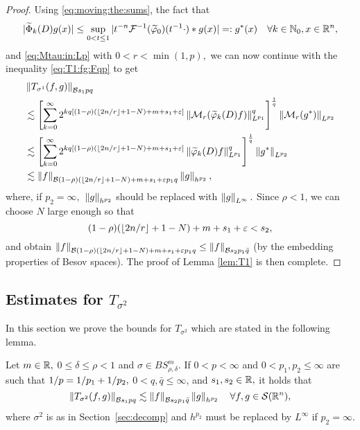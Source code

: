 \begin{proof}
Using  \eqref{eq:moving:the:sums},  the fact that  
\begin{equation}\label{def:g*}
|\widetilde{\Phi}_k(D)g(x)| \leq \sup\limits_{0 < t \le 1} |t^{-n}\mathcal{F}^{-1}(\widetilde{\varphi}_0)(t^{-1} \cdot)* g(x)| =: g^*(x) \quad \forall k \in \mathbb{N}_0,  x \in {{\mathbb R}^n}, 
\end{equation}
and \eqref{eq:Mtau:in:Lp} with $0<r < \min(1,p),$ we can now continue with the inequality \eqref{eq:T1:fg:Fqp} to get
\begin{align*}
& \left\|T_{\sigma^1}(f,g)\right\|_{\mathcal{B}{s_1}{p}{q}}\\
&  \lesssim   \left[  \sum\limits_{k=0}^\infty   2^{k q [(1-\rho)( \lfloor{2n/r}\rfloor + 1-N) + m+s_1+\varepsilon]}  \left\| \mathcal{M}_r(\widetilde{\varphi}_k(D)f)\right\|_{L^{p_1}}^q \right]^\frac{1}{q} \left\|\mathcal{M}_r(g^*)\right\|_{L^{p_2}}\\
&  \lesssim   \left[  \sum\limits_{k=0}^\infty   2^{k q [(1-\rho)( \lfloor{2n/r}\rfloor + 1-N) + m+s_1+\varepsilon]}   \left\|\widetilde{\varphi}_k(D)f\right\|_{L^{p_1}}^q \right]^\frac{1}{q} \left\|g^*\right\|_{L^{p_2}}\\
& \lesssim \left\|f\right\|_{\mathcal{B}{(1-\rho)( \lfloor{2n/r}\rfloor + 1-N) + m + s_1+\varepsilon }{p_1}{q}}  \left\| g\right\|_{h^{p_2}},
\end{align*}
 where, if $p_2=\infty,$  $\left\|g\right\|_{h^{p_2}}$ should be replaced with $\left\|g\right\|_{L^\infty}.$ Since $\rho<1$, we can choose $N$ large enough so that
$$
(1-\rho)( \lfloor{2n/r}\rfloor + 1-N) + m +s_1 +\varepsilon  < s_2,
$$
and obtain $ \left\|f\right\|_{\mathcal{B}{(1-\rho)( \lfloor{2n/r}\rfloor + 1-N) + m +s_1+ \varepsilon }{p_1}{q}} \leq  \left\|f\right\|_{\mathcal{B}{s_2}{p_1}{\bar{q}}}$ (by the embedding properties of Besov spaces). The proof of Lemma \ref{lem:T1} is then complete.

\end{proof}

\subsection{Estimates for $T_{\sigma^2}$}

In this section we prove the bounds for $T_{\sigma^2}$ which are stated in the following lemma.

\begin{lemma}\label{lem:T2} 
Let $m \in \mathbb{R},$ $0 \le \delta\le \rho < 1$ and $\sigma \in BS^m_{\rho, \delta}$. If $0<p<\infty$ and $0< p_1, p_2 \le \infty$ are such that $1/p=1/p_1+1/p_2,$ $0 < q,\bar{q} \leq \infty$, and $s_1, s_2 \in \mathbb{R},$ it holds that
\begin{equation}\label{eq:T2}
\left\|T_{\sigma^2}(f,g)\right\|_{\mathcal{B}{s_1}{p}{q}}  \lesssim \left\|f\right\|_{\mathcal{B}{s_2}{p_1}{\bar{q}}} \left\|g\right\|_{h^{p_2}} \quad \forall f, g \in {\mathcal{S}}({{\mathbb R}^n}),
\end{equation}
where $\sigma^2$ is as in Section~\ref{sec:decomp} and $h^{p_2}$ must be replaced by $L^\infty$ if $p_2=\infty.$
\end{lemma}

